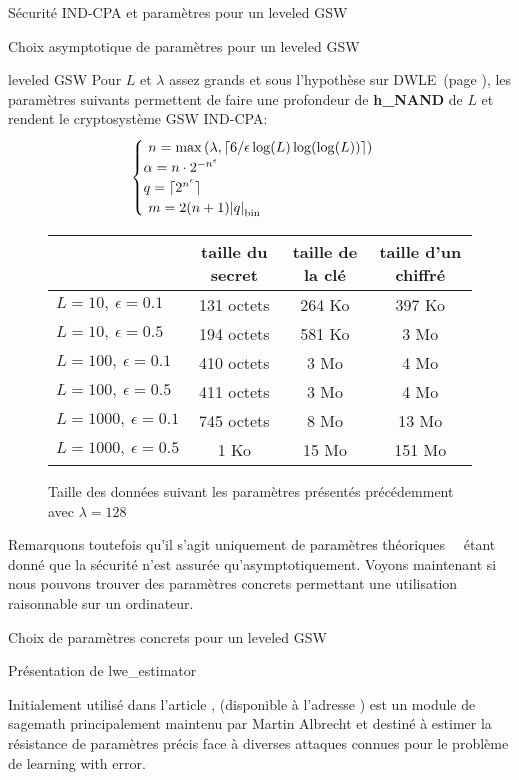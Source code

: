 \begin{section}{Sécurité IND-CPA et paramètres pour un leveled GSW}
\begin{subsection}{Choix asymptotique de paramètres pour un leveled GSW}
\begin{thm}{leveled GSW}
	Pour $L$ et $\lambda$ assez grands et sous l'hypothèse sur DWLE~(page \pageref{hyp_dlwe}), les paramètres suivants permettent de faire une profondeur de \textbf{h\_NAND} de $L$
et rendent le cryptosystème GSW IND-CPA:
\[ \begin{cases} 
	n = \max\left(\lambda, \lceil 6/\epsilon \log(L) \log(\log(L))
	\rceil\right)  \\
	\alpha  = n \cdot 2^{-n^\epsilon}  \\
	q = \lceil 2^{n^\epsilon} \rceil\\ 
	m = 2(n+1)\bnorm{q} \\  
	\end{cases}  \]
\end{thm}

\begin{figure}[!ht]
\begin{tabular}{|l|c|c|c|}
\hline
& taille du secret & taille de la clé & taille d'un chiffré \\
\hline
$L = 10, \ \epsilon = 0.1$ & 131 octets & 264 Ko & 397 Ko \\
\hline
$L = 10, \ \epsilon = 0.5$ & 194 octets & 581 Ko & 3 Mo \\
\hline
$L = 100, \ \epsilon = 0.1$ & 410 octets & 3 Mo & 4 Mo \\
\hline
$L = 100, \ \epsilon = 0.5$ & 411 octets & 3 Mo & 4 Mo \\
\hline
$L = 1000, \ \epsilon = 0.1$ & 745 octets & 8 Mo & 13 Mo \\
\hline
$L = 1000, \ \epsilon = 0.5$ & 1 Ko & 15 Mo & 151 Mo \\
\hline
\end{tabular}
\caption{Taille des données suivant les paramètres présentés précédemment avec $\lambda = 128$}
\label{size_boostrapping}
\end{figure}

Remarquons toutefois qu'il s'agit uniquement de paramètres \og théoriques \fg~\ étant donné que la sécurité n'est
assurée qu'asymptotiquement. Voyons maintenant si nous pouvons trouver des paramètres concrets permettant une utilisation 
raisonnable sur un ordinateur.

\end{subsection}

\begin{subsection}{Choix de paramètres concrets pour un leveled GSW}
\begin{subsubsection}{Présentation de lwe\_estimator}
\label{estimator}
	
Initialement utilisé dans l'article \cite{EPRINT:AlbPlaSco15},  (disponible à l'adresse
\cite{estimator}) est un module de sagemath principalement maintenu par Martin Albrecht et destiné à estimer la résistance
de paramètres précis face à diverses attaques connues pour le problème de learning with error.


\end{subsubsection}
\end{subsection}
\end{section}
